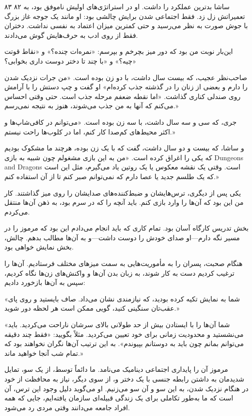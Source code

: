 ۸۳  
۸۲  
ساشا بدترین عملکرد را داشت. او در استراتژی‌های اولیش ناموفق بود، به تعمیراتش زل زد. فقط اجتماعی شدن برایش چالشی بود: او مانند یک جوجه غاز بزرگ با جوش صورت به نظر می‌رسید و حتی کمترین میزان اعتماد به نفسی نداشت. دختران فقط از روی ادب به حرف‌هایش گوش می‌دادند.  

این‌بار نوبت من بود که دور میز بچرخم و بپرسم: «نمره‌ات چنده؟» و «نقاط قوتت چیه؟» و «با چند تا دختر دوست داری بخوابی؟»

صاحب‌نظر عجیب، که بیست سال داشت، با دو زن بوده است. «من جرات نزدیک شدن را دارم و بعضی از زنان را در گذشته جذب کرده‌ام» او گفت و چپ دستش را با آرامش روی صندلی کناری گذاشت. «اما نقطه ضعفم مرحله جذب است. حتی وقتی احساس می‌کنم که آنها به من جذب می‌شوند، هنوز به نتیجه نمی‌رسم.»

جری، که سی و سه سال داشت، با سه زن بوده است. «می‌توانم در کافی‌شاپ‌ها و اکثر محیط‌های کم‌صدا کار کنم، اما در کلوب‌ها راحت نیستم.»

و ساشا، که بیست و دو سال داشت، گفت که با یک زن بوده، هرچند ما مشکوک بودیم که یکی را اغراق کرده است. «من به این بازی مشغولم چون شبیه به بازی Dungeons and Dragons است. وقتی یک نقشه معکوس یا یک روتین یاد می‌گیرم، مثل این است که یک طلسم جدید یا عصا دارم که نمی‌توانم صبر کنم تا از آن استفاده کنم.»

یکی پس از دیگری، ترس‌هایشان و ضبط‌کننده‌های صدایشان را روی میز گذاشتند. کار من این بود که آن‌ها را وارد بازی کنم. باید آنچه را که در سرم بود، به ذهن آن‌ها منتقل می‌کردم.

بخش تدریس کارگاه آسان بود. تمام کاری که باید انجام می‌دادم این بود که مرموز را در مسیر نگه دارم—او صدای خودش را دوست داشت—و به آن‌ها مطالب بدهم. چالش، بخش نمایش خواهی بود.

هنگام صحبت، پسران را به مأموریت‌هایی به سمت میزهای مختلف فرستادیم. آن‌ها را ترغیب کردیم دست به کار شوند، به زبان بدن آن‌ها و واکنش‌های زن‌ها نگاه کردیم، سپس به آن‌ها بازخورد دادیم:

«شما به نمایش تکیه کرده بودید، که نیازمندی نشان می‌داد. صاف بایستید و روی پای عقب‌تان سنگینی کنید، گویی ممکن است هر لحظه دور شوید.»

«شما آن‌ها را با ایستادن بیش از حد طولانی بالای سرشان ناراحت می‌کردید. باید می‌نشستید و محدودیت زمانی برای خود تعیین می‌کردید. مثلاً بگویید: «فقط چند دقیقه می‌توانم بمانم چون باید به دوستانم بپیوندم». به این ترتیب آن‌ها نگران نخواهند بود که تمام شب آنجا خواهید ماند.»

مرموز آن را پایداری اجتماعی دینامیک می‌نامد. ما دائماً توسط، از یک سو، تمایل شدیدمان به داشتن رابطه جنسی با یک دختر و، از سوی دیگر، نیاز به محافظت از خود در هنگام نزدیک شدن، به این سو و آن سو می‌زنیم. او می‌گوید دلیل وجود این ترس، آن است که ما به‌طور تکاملی برای یک زندگی قبیله‌ای سازمان یافته‌ایم، جایی که همه افراد جامعه می‌دانند وقتی مردی رد می‌شود.